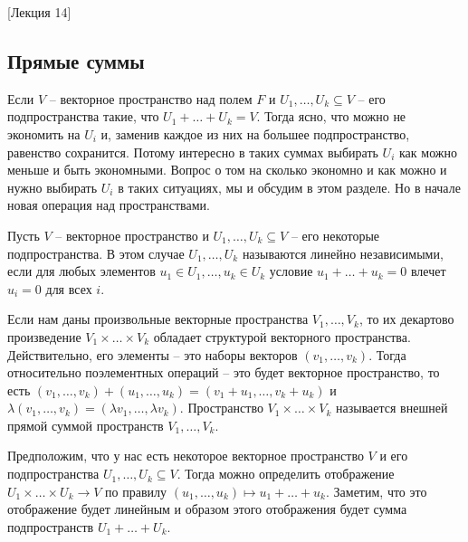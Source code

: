 [Лекция 14]


\subsection{Прямые суммы}

Если $V$ -- векторное пространство над полем $F$ и $U_1,\ldots,U_k\subseteq V$ -- его подпространства такие, что $U_1 + \ldots + U_k = V$.
Тогда ясно, что можно не экономить на $U_i$ и, заменив каждое из них на большее подпространство, равенство сохранится.
Потому интересно в таких суммах выбирать $U_i$ как можно меньше и быть экономными.
Вопрос о том на сколько экономно и как можно и нужно выбирать $U_i$ в таких ситуациях, мы и обсудим в этом разделе.
Но в начале новая операция над пространствами.

\begin{definition}
\label{def::IndepSpaces}
Пусть $V$ -- векторное пространство и $U_1,\ldots,U_k\subseteq V$ -- его некоторые подпространства.
В этом случае $U_1,\ldots, U_k$ называются линейно независимыми, если для любых элементов $u_1\in U_1, \ldots, u_k\in U_k$ условие $u_1 + \ldots + u_k = 0$ влечет $u_i = 0$ для всех $i$.
\end{definition}

\begin{definition}
Если нам даны произвольные векторные пространства $V_1,\ldots, V_k$, то их декартово произведение $V_1\times\ldots\times V_k$ обладает структурой векторного пространства.
Действительно, его элементы -- это наборы векторов $(v_1,\ldots,v_k)$.
Тогда относительно поэлементных операций -- это будет векторное пространство, то есть
$(v_1,\ldots,v_k) + (u_1,\ldots,u_k) = (v_1 + u_1,\ldots,v_k + u_k)$ и $\lambda(v_1,\ldots,v_k) = (\lambda v_1, \ldots, \lambda v_k)$.
Пространство $V_1\times\ldots \times V_k$ называется внешней прямой суммой пространств $V_1,\ldots, V_k$.
\end{definition}

Предположим, что у нас есть некоторое векторное пространство $V$ и его подпространства $U_1,\ldots,U_k\subseteq V$.
Тогда можно определить отображение $U_1\times \ldots \times U_k \to V$ по правилу $(u_1,\ldots,u_k) \mapsto u_1 + \ldots + u_k$.
Заметим, что это отображение будет линейным и образом этого отображения будет сумма подпространств $U_1 + \ldots + U_k$.


